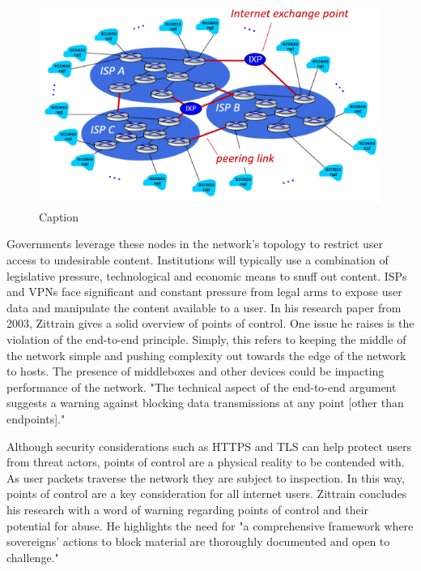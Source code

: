 \begin{figure}
    \centering
    \includegraphics[width=0.5\linewidth]{State of the Art/KuroseISPs.png}
    \caption{Caption}
    \label{fig:enter-label}
\end{figure}

Governments leverage these nodes in the network's topology to restrict user access to undesirable content.  Institutions will typically use a combination of legislative pressure, technological and economic means to snuff out content. ISPs and VPNs face significant and constant pressure from legal arms to expose user data and manipulate the content available to a user. In his research paper from 2003, Zittrain gives a solid overview of points of control. One issue he raises is the violation of the end-to-end principle. Simply, this refers to keeping the middle of the network simple and pushing complexity out towards the edge of the network to hosts. The presence of middleboxes and other devices could be impacting performance of the network. "The technical aspect of the end-to-end argument suggests a warning against blocking data transmissions at any point [other than endpoints]." \cite{Zittrain_Internet_Points_of_Control} 

Although security considerations such as HTTPS and TLS can help protect users from threat actors, points of control are a physical reality to be contended with. As user packets traverse the network they are subject to inspection. In this way, points of control are a key consideration for all internet users. Zittrain concludes his research with a word of warning regarding points of control and their potential for abuse. He highlights the need for "a comprehensive framework where sovereigns’ actions to block material are thoroughly documented and open to challenge." \cite{Zittrain_Internet_Points_of_Control} 

